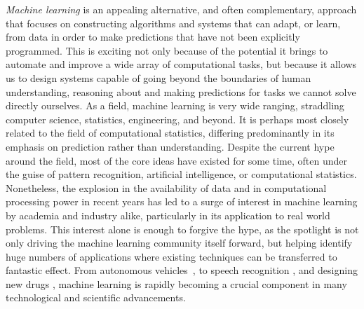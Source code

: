 \emph{Machine learning} is an appealing alternative, and often complementary,
approach that focuses on constructing algorithms and systems that can adapt, or learn, from data in order
to make predictions that have not been explicitly programmed.
This is exciting not only because of the potential it brings
to automate and improve a wide array of computational tasks, but because it allows us to design 
systems capable of going beyond the boundaries of human understanding, reasoning
about and making predictions for tasks we cannot solve directly ourselves.
As a field, machine learning is very wide ranging,
straddling computer science, statistics, engineering, and beyond. 
It is perhaps most closely related to the field of computational statistics, differing predominantly
in its emphasis on prediction rather than understanding.  Despite the current hype around the
field, most of the core ideas have existed for some
time, often under the guise of pattern recognition, artificial intelligence, or computational 
statistics.  Nonetheless, the explosion in the availability of data and in computational processing power in recent
years has led to a surge of interest in machine learning by academia and industry alike, particularly 
in its application to real world problems.  This interest alone is enough to forgive the hype, as the
spotlight is not only driving the machine learning community itself forward, but helping identify
huge numbers of applications where existing techniques can be transferred to fantastic effect.
From autonomous vehicles~\citep{lefevre2014survey}, to speech recognition \citep{jurafsky2014speech},
and designing new drugs \citep{burbidge2001drug}, machine learning is rapidly becoming a 
crucial component in many technological and scientific advancements.  


